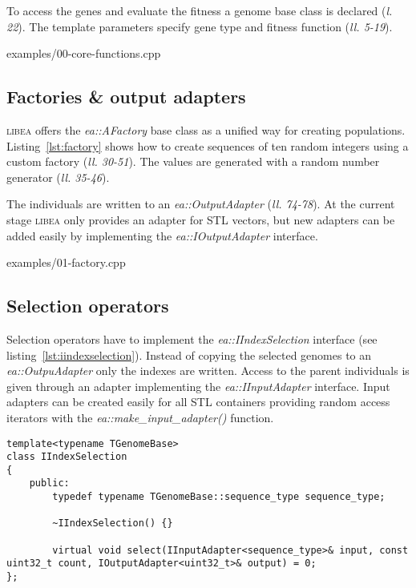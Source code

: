 \documentclass[a4paper]{article}
\begin{document}
To access the genes and evaluate the fitness a genome base class is declared (\textit{l. 22}). The template parameters specify gene type and fitness function (\textit{ll. 5-19}).

\begin{lstinputlisting}[caption=core functions,label=lst:core-functions]{examples/00-core-functions.cpp}
\end{lstinputlisting}

\subsection{Factories \& output adapters}

\textsc{libea} offers the \textit{ea::AFactory} base class as a unified way for creating populations. Listing~\ref{lst:factory} shows how to create sequences of ten random integers using a custom factory (\textit{ll. 30-51}). The values are generated with a random number generator (\textit{ll. 35-46}).

The individuals are written to an \textit{ea::OutputAdapter} (\textit{ll. 74-78}). At the current stage \textsc{libea} only provides an adapter for STL vectors, but new adapters can be added easily by implementing the \textit{ea::IOutputAdapter} interface.

\begin{lstinputlisting}[caption=custom factory,label=lst:factory]{examples/01-factory.cpp}
\end{lstinputlisting}

\subsection{Selection operators}

Selection operators have to implement the \textit{ea::IIndexSelection} interface (see listing~\ref{lst:iindexselection}). Instead of copying the selected genomes to an \textit{ea::OutpuAdapter} only the indexes are written. Access to the parent individuals is given through an adapter implementing the \textit{ea::IInputAdapter} interface. Input adapters can be created easily for all STL containers providing random access iterators with the \textit{ea::make\_input\_adapter()} function.

\begin{lstlisting}[caption=IIndexSelection,label=lst:iindexselection]
template<typename TGenomeBase>
class IIndexSelection
{
	public:
		typedef typename TGenomeBase::sequence_type sequence_type;

		~IIndexSelection() {}

		virtual void select(IInputAdapter<sequence_type>& input, const uint32_t count, IOutputAdapter<uint32_t>& output) = 0;
};
\end{lstlisting}
\end{document}
